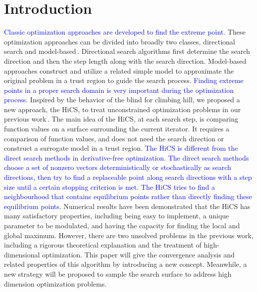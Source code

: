 \documentclass[mathpazo]{csam}
\theoremstyle{remark}
\begin{document}
	\maketitle
	
\section{Introduction}
\label{sec:intro}

\textcolor{blue}{
Classic optimization approaches are developed to find the extreme point. }
These optimization approaches can be divided into broadly two
classes, directional search and model-based\,\cite{sun2006optimization,
nocedal2006numerical, conn2009introduction}.  Directional search algorithms first
determine the search direction and then the step length along with the search
direction. Model-based approaches construct and utilize a related simple model to
approximate the original problem in a trust region to guide the search process. 
\textcolor{blue}{
Finding extreme points in a proper search domain is very important 
during the optimization process.
}
Inspired by the behavior of the blind for climbing hill, we
proposed a new approach, the HiCS, to treat unconstrained optimization problems in
our previous work\,\cite{huang2017hill}.
The main idea of the HiCS, at each search step, is comparing
function values on a surface surrounding the current iterator.
It requires a comparison of function values, and does not need the search direction
or construct a surrogate model in a trust region.
\textcolor{blue}{
The HiCS is different from the direct search methods in
derivative-free optimization. The direct search methods choose a set of nonzero
vectors deterministically or stochastically as search directions, then try to find a
replaceable point along search directions with a step size until a certain stopping
criterion is met.  
The HiCS tries to find a neighbourhood that contains equilibrium points
rather than directly finding these equilibrium points.
}
Numerical results have been demonstrated that the HiCS has many 
satisfactory properties, including being easy to implement,
a unique parameter to be modulated, and having the capacity
for finding the local and global maximum. 
However, there are two unsolved problems in the
previous work, including a rigorous theoretical explanation and
the treatment of high-dimensional optimization.
This paper will give the convergence analysis and related
properties of this algorithm by introducing a new concept. 
Meanwhile, a new strategy will be proposed to sample the search
surface to address high dimension optimization problems.
\end{document}
